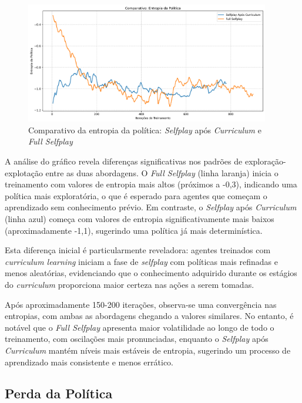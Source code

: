 \begin{figure}[H]
    \centering
    \includegraphics[width=0.95\textwidth]{fig/graficos_trabalho/graficos_experimentos/geral/comparativo_entropia_politica.png}
    \caption{Comparativo da entropia da política: \textit{Selfplay} após \textit{Curriculum} e \textit{Full Selfplay}}
    \label{fig:policy_entropy}
\end{figure}

A análise do gráfico revela diferenças significativas nos padrões de exploração-explotação entre as duas abordagens. O \textit{Full Selfplay} (linha laranja) inicia o treinamento com valores de entropia mais altos (próximos a -0,3), indicando uma política mais exploratória, o que é esperado para agentes que começam o aprendizado sem conhecimento prévio. Em contraste, o \textit{Selfplay} após \textit{Curriculum} (linha azul) começa com valores de entropia significativamente mais baixos (aproximadamente -1,1), sugerindo uma política já mais determinística.

Esta diferença inicial é particularmente reveladora: agentes treinados com \textit{curriculum learning} iniciam a fase de \textit{selfplay} com políticas mais refinadas e menos aleatórias, evidenciando que o conhecimento adquirido durante os estágios do \textit{curriculum} proporciona maior certeza nas ações a serem tomadas.

Após aproximadamente 150-200 iterações, observa-se uma convergência nas entropias, com ambas as abordagens chegando a valores similares. No entanto, é notável que o \textit{Full Selfplay} apresenta maior volatilidade ao longo de todo o treinamento, com oscilações mais pronunciadas, enquanto o \textit{Selfplay} após \textit{Curriculum} mantém níveis mais estáveis de entropia, sugerindo um processo de aprendizado mais consistente e menos errático.

\subsection{Perda da Política}

